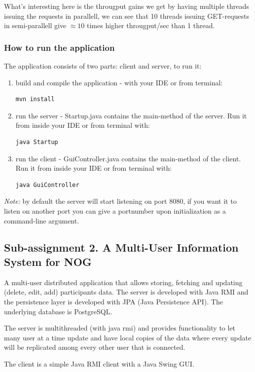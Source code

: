 \documentclass[a4paper, 11pt]{article}
\begin{document}
What's interesting here is the througput gains we get by having multiple threads issuing the requests in parallell, we can see that 10 threads issuing GET-requests in semi-parallell give $\approx 10$ times higher througput/sec than 1 thread.
\subsubsection{How to run the application}
The application consists of two parts: client and server, to run it:
\begin{enumerate}
\item build and compile the application - with your IDE or from terminal:
\begin{verbatim}
mvn install
\end{verbatim}
\item run the server - Startup.java contains the main-method of the server. Run it from inside your IDE or from terminal with: 
\begin{verbatim}
java Startup
\end{verbatim}
\item run the client - GuiController.java contains the main-method of the client. Run it from inside your IDE or from terminal with: 
\begin{verbatim}
java GuiController
\end{verbatim}
\end{enumerate}
\textit{Note:} by default the server will start listening on port 8080, if you want it to listen on another port you can give a portnumber upon initialization as a command-line argument.
\subsection{Sub-assignment 2. A Multi-User Information System for NOG}
A multi-user distributed application that allows storing, fetching and updating (delete, edit, add) participants data. The server is developed with Java RMI and the persistence layer is developed with JPA (Java Persistence API). The underlying database is PostgreSQL.

The server is multithreaded (with java rmi) and provides functionality to let many user at a time update and have local copies of the data where every update will be replicated among every other user that is connected.

The client is a simple Java RMI client with a Java Swing GUI.
\end{document}
